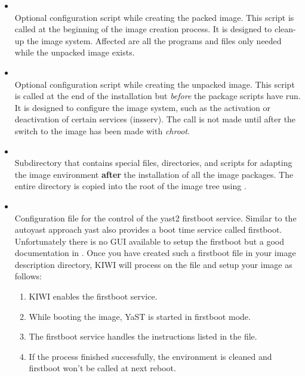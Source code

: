\begin{itemize}
\item {}\\
      Optional configuration script while creating the packed image.
      This script is called at the beginning of the image creation process.
      It is designed to clean-up the image system. Affected are all the
      programs and files only needed while the unpacked image exists.

\item {}\\
      Optional configuration script while creating the unpacked image. This
      script is called at the end of the installation but \emph{before}
      the package scripts have run. It is designed to configure the image
      system, such as the activation or deactivation of certain services
      (insserv). The call is not made until after the switch to the image
      has been made with \emph{chroot}.

\item {}\\
      Subdirectory that contains special files, directories, and scripts for
      adapting the image environment \textbf{after} the installation of all the
      image packages. The entire directory is copied into the root of the
      image tree using .

\item {}\\
      Configuration file for the control of the yast2 firstboot service.
      Similar to the autoyast approach yast also provides a boot time
      service called firstboot. Unfortunately there is no GUI available
      to setup the firstboot but a good documentation in
      . Once you have 
      created such a firstboot file in your image description directory, KIWI
      will process on the file and setup your image as follows:

      \begin{enumerate}
      \item KIWI enables the firstboot service.
      \item While booting the image, YaST is started in firstboot mode.
      \item The firstboot service handles the instructions listed in the
            file\linebreak {}.
      \item If the process finished successfully, the environment is
            cleaned and firstboot won't be called at next reboot.
      \end{enumerate}


\end{itemize}
